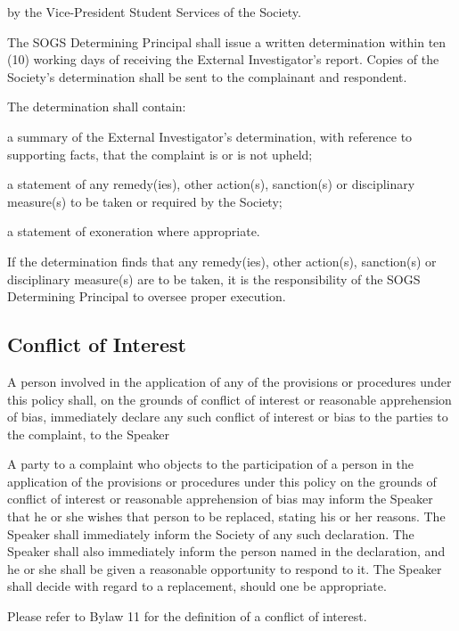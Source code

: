 \begin{longenum}[ label*=\thesubsection.\arabic*., align=left]
\begin{longenum}[ label*=\arabic*., align=left]
\begin{longenum}[ label*=\arabic*., align=left]
            \item by the Vice-President Student Services of the Society.
		\end{longenum}
        \item The SOGS Determining Principal shall issue a written determination within ten (10) working days of receiving the External Investigator's report. Copies of the Society's determination shall be sent to the complainant and respondent.
        \item The determination shall contain:
        \begin{longenum}[ label*=\arabic*., align=left]
			\item a summary of the External Investigator's determination, with reference to supporting facts, that the complaint is or is not upheld;
            \item a statement of any remedy(ies), other action(s), sanction(s) or disciplinary measure(s) to be taken or required by the Society;
            \item a statement of exoneration where appropriate.
		\end{longenum}
        \item If the determination finds that any remedy(ies), other action(s), sanction(s) or disciplinary measure(s) are to be taken, it is the responsibility of the SOGS Determining Principal to oversee proper execution.
	\end{longenum}
    
\end{longenum}
\subsection{Conflict of Interest}
\begin{longenum}[ label*=\thesubsection.\arabic*., align=left]
	\item A person involved in the application of any of the provisions or procedures under this policy shall, on the grounds of conflict of interest or reasonable apprehension of bias, immediately declare any such conflict of interest or bias to the parties to the complaint, to the Speaker
    \item A party to a complaint who objects to the participation of a person in the application of the provisions or procedures under this policy on the grounds of conflict of interest or reasonable apprehension of bias may inform the Speaker that he or she wishes that person to be replaced, stating his or her reasons. The Speaker shall immediately inform the Society of any such declaration. The Speaker shall also immediately inform the person named in the declaration, and he or she shall be given a reasonable opportunity to respond to it. The Speaker shall decide with regard to a replacement, should one be appropriate.
    \item Please refer to Bylaw 11 for the definition of a conflict of interest.
\end{longenum}
\newpage


